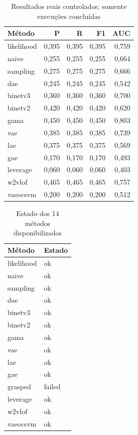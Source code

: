 \documentclass[conference]{IEEEtran}
\begin{document}
\begin{table}[t]\centering\caption{Resultados reais controlados; somente execuções concluídas}\begin{tabular}{lrrrr}\toprule
Método & P & R & F1 & AUC\\\midrule
likelihood & 0,395 & 0,395 & 0,395 & 0,759 \\
naive & 0,255 & 0,255 & 0,255 & 0,664 \\
sampling & 0,275 & 0,275 & 0,275 & 0,666 \\
dae & 0,245 & 0,245 & 0,245 & 0,542 \\
binetv3 & 0,360 & 0,360 & 0,360 & 0,700 \\
binetv2 & 0,420 & 0,420 & 0,420 & 0,620 \\
gama & 0,450 & 0,450 & 0,450 & 0,803 \\
vae & 0,385 & 0,385 & 0,385 & 0,739 \\
lae & 0,375 & 0,375 & 0,375 & 0,569 \\
gae & 0,170 & 0,170 & 0,170 & 0,493 \\
leverage & 0,060 & 0,060 & 0,060 & 0,403 \\
w2vlof & 0,465 & 0,465 & 0,465 & 0,757 \\
vaeocsvm & 0,200 & 0,200 & 0,200 & 0,512 \\
\bottomrule\end{tabular}\end{table}

\begin{table}[t]\centering\caption{Estado dos 14 métodos disponibilizados}\begin{tabular}{ll}\toprule
Método & Estado\\\midrule
likelihood & ok \\
naive & ok \\
sampling & ok \\
dae & ok \\
binetv3 & ok \\
binetv2 & ok \\
gama & ok \\
vae & ok \\
lae & ok \\
gae & ok \\
grasped & failed \\
leverage & ok \\
w2vlof & ok \\
vaeocsvm & ok \\
\bottomrule\end{tabular}\end{table}
\end{document}
